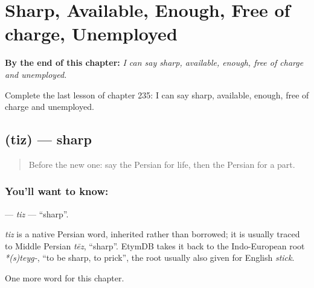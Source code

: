 
\chapter{Sharp, Available, Enough, Free of charge, Unemployed}
\label{ch:fa-sharp-available-enough-free-of-charge-unemployed}

\begin{chapteropening}
\textbf{By the end of this chapter:} \emph{I can say sharp, available, enough, free of charge and unemployed.}

Complete the last lesson of chapter 235: I can say sharp, available, enough, free of charge and unemployed.
\end{chapteropening}

\section[\texorpdfstring{\fa{تیز} (tiz)}{تیز (tiz)}]{ (tiz) — sharp}

\label{lesson:FA-C235-tiz}



\begin{quote}
Before the new one: say the Persian for life, then the Persian for a part.
\end{quote}

\subsection*{You'll want to know: }
\textbf{} — \emph{tiz} — \textquotedblleft{}sharp\textquotedblright{}.

\begin{cousinweb}
\emph{tiz} is a native Persian word, inherited rather than borrowed; it is usually traced to Middle Persian \emph{tēz}, \textquotedblleft{}sharp\textquotedblright{}. EtymDB takes it back to the Indo-European root \emph{*(s)teyg-}, \textquotedblleft{}to be sharp, to prick\textquotedblright{}, the root usually also given for English \emph{stick}.
\end{cousinweb}

\begin{grammarlens}[title={What you've built}]
One more word for this chapter.
\end{grammarlens}

